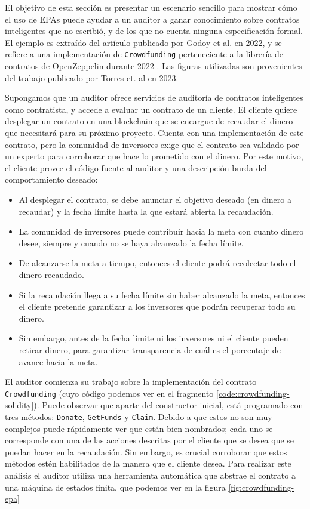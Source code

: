 El objetivo de esta sección es presentar un escenario sencillo para mostrar cómo el uso de EPAs puede ayudar a un auditor a ganar conocimiento sobre contratos inteligentes que no escribió, y de los que no cuenta ninguna especificación formal.
El ejemplo es extraído del artículo publicado por Godoy et al. en 2022\cite{predicate-abstraction-for-smart-contract-validation}, y se refiere a una implementación de \texttt{Crowdfunding} perteneciente a la librería de contratos de OpenZeppelin durante 2022 \cite{open-zeppelin-library}.
Las figuras utilizadas son provenientes del trabajo publicado por Torres et. al en 2023\cite{torres}.

Supongamos que un auditor ofrece servicios de auditoría de contratos inteligentes como contratista, y accede a evaluar un contrato de un cliente.
El cliente quiere desplegar un contrato en una blockchain que se encargue de recaudar el dinero que necesitará para su próximo proyecto.
Cuenta con una implementación de este contrato, pero la comunidad de inversores exige que el contrato sea validado por un experto para corroborar que hace lo prometido con el dinero.
Por este motivo, el cliente provee el código fuente al auditor y una descripción burda del comportamiento deseado:
\begin{itemize}
    \item Al desplegar el contrato, se debe anunciar el objetivo deseado (en dinero a recaudar) y la fecha límite hasta la que estará abierta la recaudación.
    \item La comunidad de inversores puede contribuir hacia la meta con cuanto dinero desee, siempre y cuando no se haya alcanzado la fecha límite.
    \item De alcanzarse la meta a tiempo, entonces el cliente podrá recolectar todo el dinero recaudado.
    \item Si la recaudación llega a su fecha límite sin haber alcanzado la meta, entonces el cliente pretende garantizar a los inversores que podrán recuperar todo su dinero.
    \item Sin embargo, antes de la fecha límite ni los inversores ni el cliente pueden retirar dinero, para garantizar transparencia de cuál es el porcentaje de avance hacia la meta.
\end{itemize}

El auditor comienza su trabajo sobre la implementación del contrato \texttt{Crowdfunding} (cuyo código podemos ver en el fragmento \ref{code:crowdfunding-solidity}).
Puede observar que aparte del constructor inicial, está programado con tres métodos: \texttt{Donate}, \texttt{GetFunds} y \texttt{Claim}.
Debido a que estos no son muy complejos puede rápidamente ver que están bien nombrados; cada uno se corresponde con una de las acciones descritas por el cliente que se desea que se puedan hacer en la recaudación.
Sin embargo, es crucial corroborar que estos métodos estén habilitados de la manera que el cliente desea.
Para realizar este análisis el auditor utiliza una herramienta automática que abstrae el contrato a una máquina de estados finita, que podemos ver en la figura \ref{fig:crowdfunding-epa}


